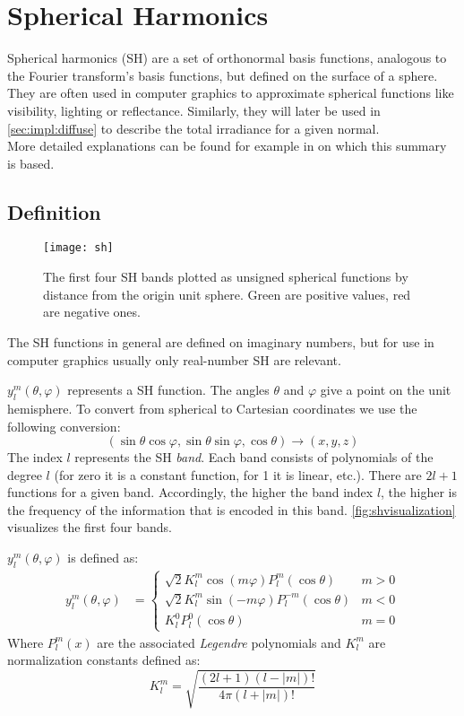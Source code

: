 \documentclass[thesis.tex]{subfiles}
\begin{document}
\section{Spherical Harmonics}\label{sec:preq:sh}
Spherical harmonics (SH) are a set of orthonormal basis functions, analogous to the Fourier transform's basis functions, but defined on the surface of a sphere.
They are often used in computer graphics to approximate spherical functions like visibility, lighting or reflectance. Similarly, they will later be used in \autoref{sec:impl:diffuse} to describe the total irradiance for a given normal.
\\
More detailed explanations can be found for example in \cite{bib:grittysh, bib:stupidsh} on which this summary is based.

\subsection{Definition} \label{chap:sh:def}
\begin{figure}[h]
	\centering
	\texttt{[image: sh]}
	\caption{\cite{bib:guerrero:thesis} The first four SH bands plotted as unsigned spherical functions by distance from the origin unit sphere. Green are positive values, red are negative ones.}
	\label{fig:shvisualization}
\end{figure}
The SH functions in general are defined on imaginary numbers, but for use in computer graphics usually only real-number SH are relevant.

$y^m_l(\theta, \varphi)$ represents a SH function.
The angles $\theta$ and $\varphi$ give a point on the unit hemisphere.
To convert from spherical to Cartesian coordinates we use the following conversion:
\begin{equation} \label{equ:postoangle}
(\sin\theta\cos\varphi, \sin\theta\sin\varphi, \cos\theta) \rightarrow (x,y,z)
\end{equation}
The index $l$ represents the SH \emph{band}.
Each band consists of polynomials of the degree $l$ (for zero it is a constant function, for 1 it is linear, etc.).
There are $2l+1$ functions for a given band.
Accordingly, the higher the band index $l$, the higher is the frequency of the information that is encoded in this band.
\autoref{fig:shvisualization} visualizes the first four bands.

$y^m_l(\theta, \varphi)$ is defined as:
\begin{equation}
	\begin{alignedat}{2}
		y^m_l(\theta, \varphi) &= \begin{cases}
		\sqrt{2}K^m_l \cos(m\varphi) P^m_l(\cos\theta) & m>0\\
		\sqrt{2}K^m_l \sin(-m\varphi) P^{-m}_l(\cos\theta) & m<0\\
		K^0_l P^0_l(\cos\theta) & m=0\end{cases}
	\end{alignedat}
\end{equation}
Where $P^m_l(x)$ are the associated \emph{Legendre} polynomials and $K^m_l$ are normalization constants defined as:
\begin{equation}
	K^m_l = \sqrt{\frac{(2l+1)(l-|m|)!}{4\pi(l+|m|)!}}
\end{equation}
\end{document}
